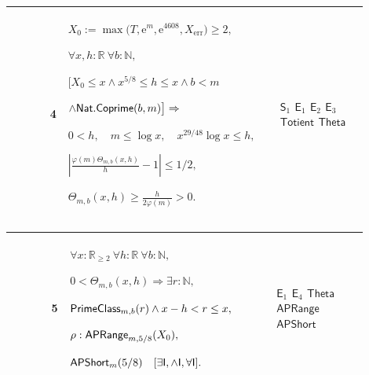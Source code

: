 \documentclass[12pt,reqno]{amsart}
\theoremstyle{blueplain}
\numberwithin{equation}{section}
\begin{document}
{\scriptsize \setlength{\parskip}{0pt}\nointerlineskip
\noindent 
\begin{tabular}{|@{}>{\centering\arraybackslash}m{0.10658\linewidth}|>{\centering\arraybackslash}m{0.03553\linewidth}|>{\centering\arraybackslash}m{0.52105\linewidth}|>{\centering\arraybackslash}m{0.23684\linewidth}|}
\hline
{\hypertarget{row:E4}{$\mathsf{E}$}} & {4} & {$\displaystyle X_0:=\max\bigl(%
T,\mathrm{e}^m,\mathrm{e}^{4608},X_{\mathrm{err}}\bigr)\ge2,$ \par$%
\displaystyle \forall x,h:\mathbb{R}\ \forall b:\mathbb{N},$ \par$%
\displaystyle \bigl[X_0\le x\wedge x^{5/8}\le h\le x\wedge b<m$ \par$%
\displaystyle \wedge \hyperlink{def:Nat.Coprime}{\mathsf{Nat.Coprime} }(b,m)%
\bigr]\Rightarrow$ \par$\displaystyle 0<h,\quad m\le\log x,\quad
x^{29/48}\log x\le h,$ \par$\displaystyle \left|\frac{\varphi(m)%
\Theta_{m,b}(x,h)}h-1\right|\le1/2,$ \par$\displaystyle \Theta_{m,b}(x,h)\ge%
\frac h{2\varphi(m)}>0.$} & {\hyperlink{row:S1}{$\mathsf{S}_{1}$} \hyperlink{row:E1}%
{$\mathsf{E}_{1}$} \hyperlink{row:E2}{$\mathsf{E}_{2}$} \hyperlink{row:E3}{$%
\mathsf{E}_{3}$} \hyperlink{def:Totient}{$\mathsf{Totient}$} \hyperlink{def:Theta}%
{$\mathsf{Theta}$}} \\ \hline
\end{tabular}
}

{\scriptsize \setlength{\parskip}{0pt}\nointerlineskip
\noindent 
\begin{tabular}{|@{}>{\centering\arraybackslash}m{0.10658\linewidth}|>{\centering\arraybackslash}m{0.03553\linewidth}|>{\centering\arraybackslash}m{0.52105\linewidth}|>{\centering\arraybackslash}m{0.23684\linewidth}|}
\hline
{\hypertarget{row:E5}{$\mathsf{E}$}} & {5} & {$\displaystyle \forall x:%
\mathbb{R}_{\ge2}\ \forall h:\mathbb{R}\ \forall b:\mathbb{N},$ \par$%
\displaystyle 0<\Theta_{m,b}(x,h)\Rightarrow\exists r:\mathbb{N},$ \par$%
\displaystyle \hyperlink{def:PrimeClass}{\mathsf{PrimeClass} }%
_{m,b}(r)\wedge x-h<r\le x,$ \par$\displaystyle \rho:\hyperlink{def:APRange}{%
\mathsf{APRange} }_{m,5/8}(X_0),$ \par$\displaystyle \hyperlink{def:APShort}{%
\mathsf{APShort} }_m(5/8)\quad[\exists\mathsf{I},\wedge\mathsf{I},\forall%
\mathsf{I}].$} & {\hyperlink{row:E1}{$\mathsf{E}_{1}$} \hyperlink{row:E4}{$%
\mathsf{E}_{4}$} \hyperlink{def:Theta}{$\mathsf{Theta}$} \hyperlink{def:APRange}%
{$\mathsf{APRange}$} \hyperlink{def:APShort}{$\mathsf{APShort}$}} \\ \hline
\end{tabular}
}
\end{document}
